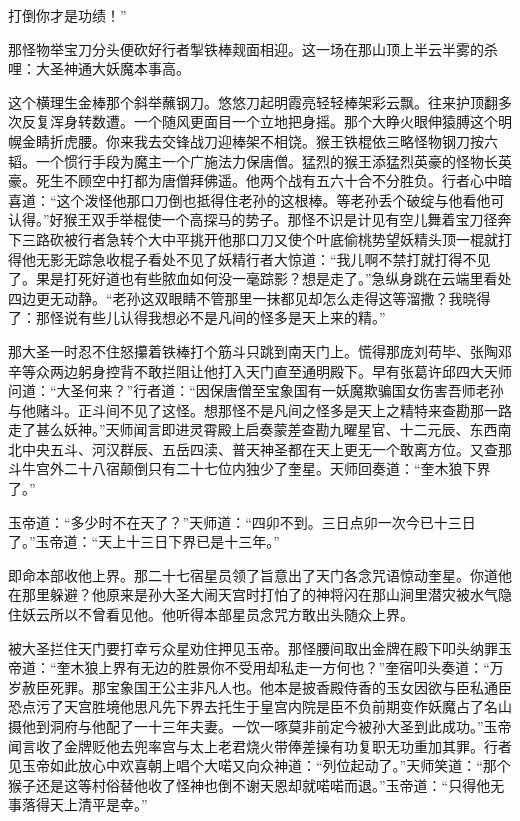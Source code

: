 \documentclass[12pt,UTF8]{ctexbook}
\begin{document}
{打倒你才是功绩！”

那怪物举宝刀分头便砍好行者掣铁棒觌面相迎。这一场在那山顶上半云半雾的杀哩：大圣神通大妖魔本事高。

这个横理生金棒那个斜举蘸钢刀。悠悠刀起明霞亮轻轻棒架彩云飘。往来护顶翻多次反复浑身转数遭。一个随风更面目一个立地把身摇。那个大睁火眼伸猿膊这个明幌金睛折虎腰。你来我去交锋战刀迎棒架不相饶。猴王铁棍依三略怪物钢刀按六韬。一个惯行手段为魔主一个广施法力保唐僧。猛烈的猴王添猛烈英豪的怪物长英豪。死生不顾空中打都为唐僧拜佛遥。他两个战有五六十合不分胜负。行者心中暗喜道：“这个泼怪他那口刀倒也抵得住老孙的这根棒。等老孙丢个破绽与他看他可认得。”好猴王双手举棍使一个高探马的势子。那怪不识是计见有空儿舞着宝刀径奔下三路砍被行者急转个大中平挑开他那口刀又使个叶底偷桃势望妖精头顶一棍就打得他无影无踪急收棍子看处不见了妖精行者大惊道：“我儿啊不禁打就打得不见了。果是打死好道也有些脓血如何没一毫踪影？想是走了。”急纵身跳在云端里看处四边更无动静。“老孙这双眼睛不管那里一抹都见却怎么走得这等溜撒？我晓得了：那怪说有些儿认得我想必不是凡间的怪多是天上来的精。”

那大圣一时忍不住怒攥着铁棒打个筋斗只跳到南天门上。慌得那庞刘苟毕、张陶邓辛等众两边躬身控背不敢拦阻让他打入天门直至通明殿下。早有张葛许邱四大天师问道：“大圣何来？”行者道：“因保唐僧至宝象国有一妖魔欺骗国女伤害吾师老孙与他赌斗。正斗间不见了这怪。想那怪不是凡间之怪多是天上之精特来查勘那一路走了甚么妖神。”天师闻言即进灵霄殿上启奏蒙差查勘九曜星官、十二元辰、东西南北中央五斗、河汉群辰、五岳四渎、普天神圣都在天上更无一个敢离方位。又查那斗牛宫外二十八宿颠倒只有二十七位内独少了奎星。天师回奏道：“奎木狼下界了。”

玉帝道：“多少时不在天了？”天师道：“四卯不到。三日点卯一次今已十三日了。”玉帝道：“天上十三日下界已是十三年。”

即命本部收他上界。那二十七宿星员领了旨意出了天门各念咒语惊动奎星。你道他在那里躲避？他原来是孙大圣大闹天宫时打怕了的神将闪在那山涧里潜灾被水气隐住妖云所以不曾看见他。他听得本部星员念咒方敢出头随众上界。

被大圣拦住天门要打幸亏众星劝住押见玉帝。那怪腰间取出金牌在殿下叩头纳罪玉帝道：“奎木狼上界有无边的胜景你不受用却私走一方何也？”奎宿叩头奏道：“万岁赦臣死罪。那宝象国王公主非凡人也。他本是披香殿侍香的玉女因欲与臣私通臣恐点污了天宫胜境他思凡先下界去托生于皇宫内院是臣不负前期变作妖魔占了名山摄他到洞府与他配了一十三年夫妻。一饮一啄莫非前定今被孙大圣到此成功。”玉帝闻言收了金牌贬他去兜率宫与太上老君烧火带俸差操有功复职无功重加其罪。行者见玉帝如此放心中欢喜朝上唱个大喏又向众神道：“列位起动了。”天师笑道：“那个猴子还是这等村俗替他收了怪神也倒不谢天恩却就喏喏而退。”玉帝道：“只得他无事落得天上清平是幸。”

}
\end{document}
